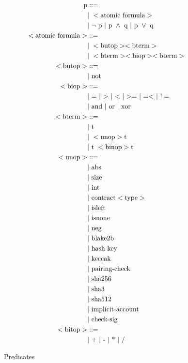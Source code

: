 \documentclass[runningheads]{llncs}
\begin{document}
\pagebreak
\begin{figure}
\begin{align*}
\text{p} &::= \\
   &\text{$\mid$}\ < \text{atomic formula} > \\
   &\text{$\mid$}\ \neg\ \text{p} \
   \text{$\mid$}\ \text{p}\ \wedge\ \text{q} \
   \text{$\mid$}\ \text{p}\ \vee\ \text{q} \\
< \text{atomic formula} > &::= \\ 
    &\text{$\mid$}\ < \text{butop} > < \text{bterm} >\\ 
   &\text{$\mid$}\  < \text{bterm} >  < \text{biop} > < \text{bterm} >\\ 
< \text{butop} > &::= \\
   &\text{$\mid$}\ \text{not} \\
< \text{biop} > &::= \\
   &\text{$\mid$}\ \text{$=$} \
   \text{$\mid$}\ \text{$>$} \
   \text{$\mid$}\ \text{$<$} \
   \text{$\mid$}\ \text{$>=$} \
   \text{$\mid$}\ \text{$=<$} \
   \text{$\mid$}\ \text{$!=$} \\
   &\text{$\mid$}\ \text{and}\ \text{$\mid$}\ \text{or}\ \text{$\mid$}\ \text{xor}\\
< \text{bterm} > &::= \\ 
   &\text{$\mid$}\ \text{t} \\
   &\text{$\mid$}\ < \text{unop} > \text{t} \\ 
   &\text{$\mid$}\ \text{t}\ < \text{binop} > \text{t}\\  
< \text{unop} > &::= \\ 
   &\text{$\mid$}\ \text{abs} \\
   &\text{$\mid$}\ \text{size} \\
   &\text{$\mid$}\ \text{int} \\
   &\text{$\mid$}\ \text{contract}  < \text{type} > \\
   &\text{$\mid$}\ \text{isleft} \\
   &\text{$\mid$}\ \text{isnone} \\
   &\text{$\mid$}\ \text{neg} \\
   &\text{$\mid$}\ \text{blake2b} \\
   &\text{$\mid$}\ \text{hash-key} \\
   &\text{$\mid$}\ \text{keccak} \\
   &\text{$\mid$}\ \text{pairing-check} \\
   &\text{$\mid$}\ \text{sha256} \\
   &\text{$\mid$}\ \text{sha3} \\
   &\text{$\mid$}\ \text{sha512} \\
   &\text{$\mid$}\ \text{implicit-account} \\
   &\text{$\mid$}\ \text{check-sig} \\
< \text{bitop} > &::= \\ 
   &\text{$\mid$}\ \text{+}\ \text{$\mid$}\ \text{-}\ \text{$\mid$}\ \text{*}\ \text{$\mid$}\ \text{/}
\end{align*}
\caption{Predicates}
\label{fig:predicate}
\end{figure}
\end{document}
